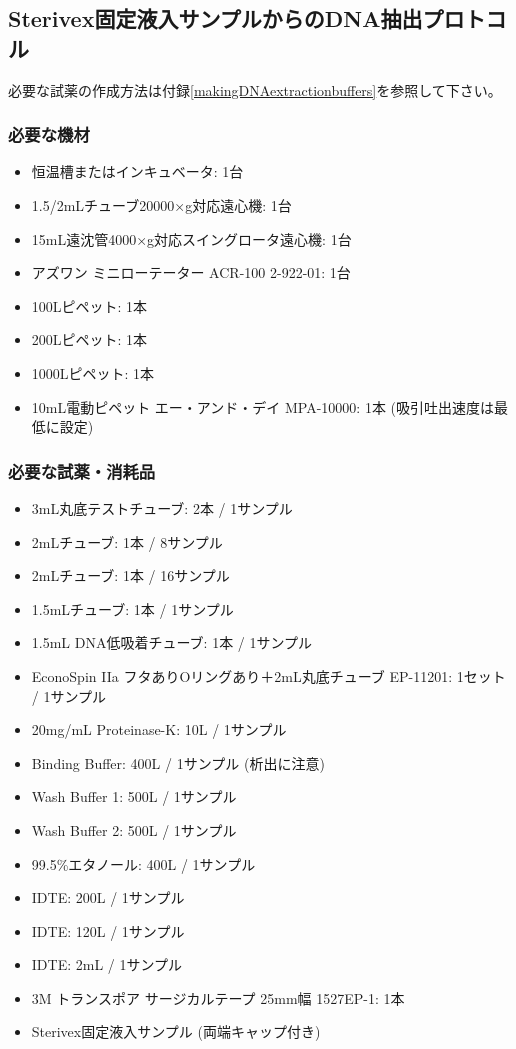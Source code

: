 \documentclass[titlepage,10pt,a4paper,uplatex]{jsbook}
\begin{document}
\subsection{Sterivex固定液入サンプルからのDNA抽出プロトコル}

必要な試薬の作成方法は付録\ref{makingDNAextractionbuffers}を参照して下さい。

\subsubsection{必要な機材}
\begin{itemize}
\item 恒温槽またはインキュベータ: 1台
\item 1.5/2mLチューブ20000×g対応遠心機: 1台
\item 15mL遠沈管4000×g対応スイングロータ遠心機: 1台
\item アズワン ミニローテーター ACR-100 2-922-01: 1台
\item 100{\textmu}Lピペット: 1本
\item 200{\textmu}Lピペット: 1本
\item 1000{\textmu}Lピペット: 1本
\item 10mL電動ピペット エー・アンド・デイ MPA-10000: 1本 (吸引吐出速度は最低に設定)
\end{itemize}

\subsubsection{必要な試薬・消耗品}
\begin{itemize}
\item 3mL丸底テストチューブ: 2本 / 1サンプル
\item 2mLチューブ: 1本 / 8サンプル
\item 2mLチューブ: 1本 / 16サンプル
\item 1.5mLチューブ: 1本 / 1サンプル
\item 1.5mL DNA低吸着チューブ: 1本 / 1サンプル
\item EconoSpin IIa フタありOリングあり＋2mL丸底チューブ EP-11201: 1セット / 1サンプル
\item 20mg/mL Proteinase-K: 10{\textmu}L / 1サンプル
\item Binding Buffer: 400{\textmu}L / 1サンプル (析出に注意)
\item Wash Buffer 1: 500{\textmu}L / 1サンプル
\item Wash Buffer 2: 500{\textmu}L / 1サンプル
\item 99.5\%エタノール: 400{\textmu}L / 1サンプル
\item IDTE: 200{\textmu}L / 1サンプル
\item IDTE: 120{\textmu}L / 1サンプル
\item IDTE: 2mL / 1サンプル
\item 3M トランスポア サージカルテープ 25mm幅 1527EP-1: 1本
\item Sterivex固定液入サンプル (両端キャップ付き)
\end{itemize}
\end{document}
